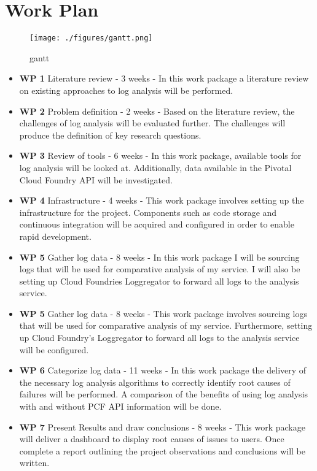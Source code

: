 \chapter{Work Plan}

\begin{figure}[h!]
  \centering
  \texttt{[image: ./figures/gantt.png]}
  \caption{gantt}
  \label{fig:gantt}
\end{figure}

\begin{itemize}
  \item \textbf{WP 1} Literature review - 3 weeks - In this work package a literature review on existing approaches to log analysis will be performed.
  
  \item \textbf{WP 2} Problem definition - 2 weeks - Based on the literature review, the challenges of log analysis will be evaluated further. The challenges will produce the definition of key research questions.
  
  \item \textbf{WP 3} Review of tools - 6 weeks - In this work package, available tools for log analysis will be looked at. Additionally, data available in the Pivotal Cloud Foundry API will be investigated.
  
\item \textbf{WP 4} Infrastructure - 4 weeks - This work package involves setting up the infrastructure for the project. Components such as code storage and continuous integration will be acquired and configured in order to enable rapid development. 
  
  \item \textbf{WP 5} Gather log data - 8 weeks - In this work package I will be sourcing logs that will be used for comparative analysis of my service. I will also be setting up Cloud Foundries Loggregator to forward all logs to the analysis service.
  
  \item \textbf{WP 5} Gather log data - 8 weeks - This work package involves sourcing logs that will be used for comparative analysis of my service. Furthermore, setting up Cloud Foundry's Loggregator to forward all logs to the analysis service will be configured.
  
  \item \textbf{WP 6} Categorize log data - 11 weeks - In this work package the delivery of the necessary log analysis algorithms to correctly identify root causes of failures will be performed. A comparison of the benefits of using log analysis with and without PCF API information will be done.
    
  \item \textbf{WP 7} Present Results and draw conclusions - 8 weeks - This work package will deliver a dashboard to display root causes of issues to users. Once complete a report outlining the project observations and conclusions will be written.
\end{itemize}

